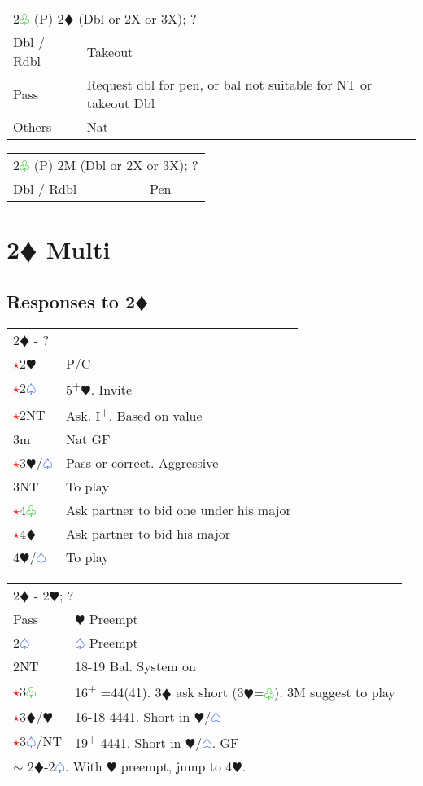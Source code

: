 \documentclass{article}
\renewcommand{\sp}{\textcolor{RoyalBlue}{$\varspade$}}
\newcommand{\he}{\textcolor{RubineRed}{$\varheart$}}
\newcommand{\di}{\textcolor{Peach}{$\vardiamond$}}
\newcommand{\cl}{\textcolor{LimeGreen}{$\varclub$}}
\newcommand{\nt}{\relsize{-1}NT\relsize{1}}
\newcommand{\up}{\textsuperscript{+}}
\newcommand{\al}{\textcolor{red}{$\star$}}
\begin{document}
\medskip

\begin{tabular}{|l|p{6.5cm}}
	\multicolumn{2}{l}{2\cl{} (P) 2\di{} (Dbl or 2X or 3X); ?}\\
	Dbl / Rdbl & Takeout \\
	Pass & Request dbl for pen, or bal not suitable for \nt{} or takeout Dbl \\
	Others & Nat \\
\end{tabular}

\medskip

\begin{tabular}{|l|p{6.5cm}}
	\multicolumn{2}{l}{2\cl{} (P) 2M (Dbl or 2X or 3X); ?}\\
	Dbl / Rdbl & Pen \\
\end{tabular}

\section{2\di{} Multi}

\subsection{Responses to 2\di{}}

\begin{tabular}{|l|p{6.5cm}}
	\multicolumn{2}{l}{2\di{} - ?}\\
	\al{}2\he{} & P/C \\
	\al{}2\sp{} & 5\up{}\he{}. Invite \\
	\al{}2\nt{} & Ask. I\up{}. Based on value \\
	3m & Nat GF \\
	\al{}3\he{}/\sp{} & Pass or correct. Aggressive \\
	3\nt{} & To play \\
	\al{}4\cl{} & Ask partner to bid one under his major \\
	\al{}4\di{} & Ask partner to bid his major \\
	4\he{}/\sp{} & To play \\
\end{tabular}

\medskip

\begin{tabular}{|l|p{6.5cm}}
	\multicolumn{2}{l}{2\di{} - 2\he{}; ?}\\
	Pass & \he{} Preempt \\
	2\sp{} & \sp{} Preempt \\
	2\nt{} & 18-19 Bal. System on \\
	\al{}3\cl{} & 16\up{} =44(41). 3\di{} ask short (3\he{}=\cl{}). 3M suggest to play \\
	\al{}3\di{}/\he{} & 16-18 4441. Short in \he{}/\sp{} \\
	\al{}3\sp{}/\nt{} & 19\up{} 4441. Short in \he{}/\sp{}. GF \\
	\multicolumn{2}{l}{$\sim$ 2\di{}-2\sp{}. With \he{} preempt, jump to 4\he{}.}
\end{tabular}
\end{document}
